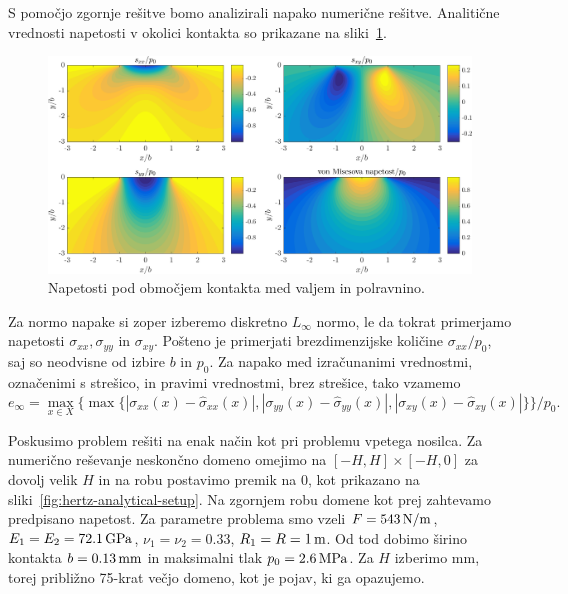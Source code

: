 \documentclass[12pt,a4paper,twoside]{article}
\theoremstyle{definition} %
\theoremstyle{plain} %
\numberwithin{equation}{section}
\begin{document}
S pomočjo zgornje rešitve bomo analizirali napako numerične rešitve.
Analitične vrednosti napetosti v okolici kontakta so prikazane na sliki~\ref{fig:hertz-analytical}.

\begin{figure}[!h]
  \centering
  \includegraphics[width=\textwidth]{images/hertzian_analytical.png}
  \caption{Napetosti pod območjem kontakta med valjem in polravnino.}
  \label{fig:hertz-analytical}
\end{figure}

Za normo napake si zoper izberemo diskretno $L_\infty$ normo, le da tokrat
primerjamo napetosti $\sigma_{xx}, \sigma_{yy}$ in $\sigma_{xy}$. Pošteno je primerjati
brezdimenzijske količine $\sigma_{xx}/p_0$, saj so neodvisne od izbire $b$ in $p_0$.
Za napako med izračunanimi vrednostmi, označenimi s strešico, in pravimi vrednostmi, brez strešice,
tako vzamemo
\begin{equation}
  e_\infty = \max_{x\in X} \{\max\{|\sigma_{xx}(x)-\hat{\sigma}_{xx}(x)|,
                                   |\sigma_{yy}(x)-\hat{\sigma}_{yy}(x)|,
                                   |\sigma_{xy}(x)-\hat{\sigma}_{xy}(x)| \}\} / p_0.
\end{equation}

Poskusimo problem rešiti na enak način kot pri problemu vpetega nosilca.
Za numerično reševanje neskončno domeno omejimo na $[-H, H] \times [-H, 0]$ za dovolj velik $H$
in na robu postavimo premik na 0, kot prikazano na sliki~\ref{fig:hertz-analytical-setup}. Na
zgornjem robu domene kot prej zahtevamo predpisano napetost.  Za parametre problema smo vzeli $F =
\unit[543]{N/m}$, $E_1 = E_2 = \unit[72.1]{GPa}$, $\nu_1 = \nu_2 = 0.33$, $R_1 = R = \unit[1]{m}$.
Od tod dobimo širino kontakta $b = \unit[0.13]{mm}$ in maksimalni tlak $p_0 = \unit[2.6]{MPa}$.
Za $H$ izberimo \unit[10]{mm}, torej približno 75-krat večjo domeno, kot je pojav, ki ga opazujemo.
\end{document}
